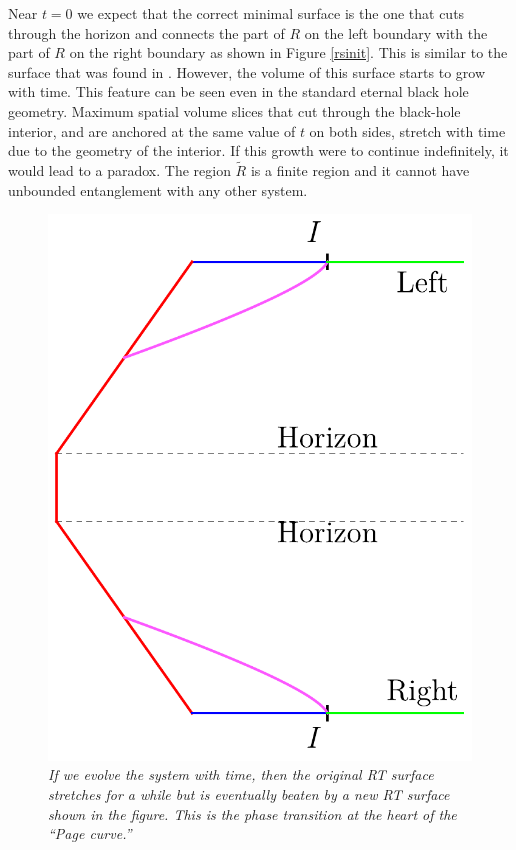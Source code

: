 \documentclass[12pt]{article}
\begin{document}
Near $t = 0$ we expect that the correct minimal surface is the one that cuts through the horizon and connects the part of $R$ on the left boundary with the part of $R$ on the right boundary as shown in Figure \ref{rsinit}. This is similar to the surface that was found in \cite{Hartman:2013qma}. However, the volume of this surface starts to grow with time. This feature can be seen even in the standard eternal black hole geometry. Maximum spatial volume slices that cut through the black-hole interior, and are anchored at the same value of $t$ on both sides, stretch with time due to the geometry of the interior. If this growth were to continue indefinitely, it would lead to a paradox. The region $\widetilde{R}$ is a finite region and it cannot have unbounded entanglement with any other system.

\begin{figure}[!ht]
\begin{center}
\includegraphics[height=0.4\textheight]{rtisland.pdf}
\caption{\em If we evolve the system with time, then the original RT surface stretches for a while but is eventually beaten by a new RT surface shown in the figure. This is the phase transition at the heart of the ``Page curve.'' \label{rtisland}}
\end{center}
\end{figure}
\end{document}
